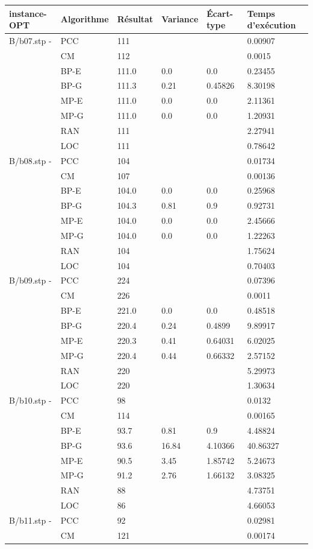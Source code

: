 \documentclass[12pt,a4paper]{article}
\begin{document}
\begin{center}
	\begin{tabular}{l|l|l|l|l|l}
		instance-OPT & Algorithme & Résultat & Variance & Écart-type & Temps d'exécution\\ \hline \hline
		B/b07.stp - &PCC&111&&&0.00907\\
		&CM&112&&&0.0015\\
		&BP-E&111.0&0.0&0.0&0.23455\\
		&BP-G&111.3&0.21&0.45826&8.30198\\
		&MP-E&111.0&0.0&0.0&2.11361\\&MP-G&111.0&0.0&0.0&1.20931\\
		&RAN&111&&&2.27941\\
		&LOC&111&&&0.78642\\\hline
		B/b08.stp - &PCC&104&&&0.01734\\
		&CM&107&&&0.00136\\
		&BP-E&104.0&0.0&0.0&0.25968\\
		&BP-G&104.3&0.81&0.9&0.92731\\
		&MP-E&104.0&0.0&0.0&2.45666\\&MP-G&104.0&0.0&0.0&1.22263\\
		&RAN&104&&&1.75624\\
		&LOC&104&&&0.70403\\\hline
		B/b09.stp - &PCC&224&&&0.07396\\
		&CM&226&&&0.0011\\
		&BP-E&221.0&0.0&0.0&0.48518\\
		&BP-G&220.4&0.24&0.4899&9.89917\\
		&MP-E&220.3&0.41&0.64031&6.02025\\&MP-G&220.4&0.44&0.66332&2.57152\\
		&RAN&220&&&5.29973\\
		&LOC&220&&&1.30634\\\hline
		B/b10.stp - &PCC&98&&&0.0132\\
		&CM&114&&&0.00165\\
		&BP-E&93.7&0.81&0.9&4.48824\\
		&BP-G&93.6&16.84&4.10366&40.86327\\
		&MP-E&90.5&3.45&1.85742&5.24673\\&MP-G&91.2&2.76&1.66132&3.08325\\
		&RAN&88&&&4.73751\\
		&LOC&86&&&4.66053\\\hline
		B/b11.stp - &PCC&92&&&0.02981\\
		&CM&121&&&0.00174\\

\end{tabular}
\end{center}
\end{document}
